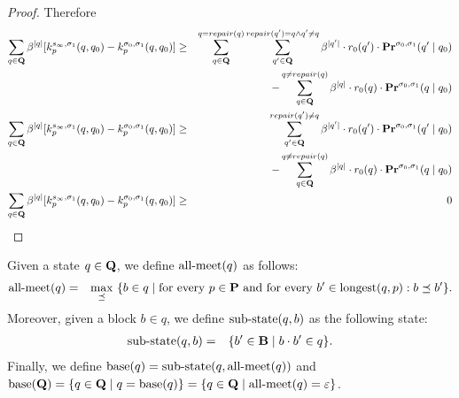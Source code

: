 \begin{proof}
	Therefore
	\begin{eqnarray*}
		\sum_{q \in \mathbf{Q}} \beta^{|q|} [k^{s_{\infty},\sigma_1}_p(q,q_0)- k^{\sigma_0,\sigma_1}_p(q,q_0) ] & \geq & \sum_{q \in \mathbf{Q}}^{q = repair(q)}\sum_{q'\in \mathbf{Q}}^{repair(q') = q \land q' \neq q}  \beta^{|q'|} \cdot r_0(q') \cdot \mathbf{Pr}^{\sigma_0,\sigma_1}(q' \mid q_0)\\
		&& - \sum_{q \in \mathbf{Q}}^{q \neq repair(q)} \beta^{|q|} \cdot r_0(q)\cdot\mathbf{Pr}^{\sigma_0,\sigma_1}(q \mid q_0) \\
		\sum_{q \in \mathbf{Q}} \beta^{|q|} [k^{s_{\infty},\sigma_1}_p(q,q_0)- k^{\sigma_0,\sigma_1}_p(q,q_0) ] & \geq & \sum_{q'\in \mathbf{Q}}^{repair(q') \neq q }  \beta^{|q'|} \cdot r_0(q') \cdot \mathbf{Pr}^{\sigma_0,\sigma_1}(q' \mid q_0)\\
		&& - \sum_{q \in \mathbf{Q}}^{q \neq repair(q)} \beta^{|q|} \cdot r_0(q)\cdot\mathbf{Pr}^{\sigma_0,\sigma_1}(q \mid q_0) \\
		\sum_{q \in \mathbf{Q}} \beta^{|q|} [k^{s_{\infty},\sigma_1}_p(q,q_0)- k^{\sigma_0,\sigma_1}_p(q,q_0) ] & \geq & 0\\
	\end{eqnarray*}
	
	
\end{proof}

Given a state $q \in \mathbf{Q}$, we define $\text{\rm all-meet}(q)$ as follows:
\begin{eqnarray*}
\text{\rm all-meet}(q)  & =  & \max_{\preceq} \ \{b \in q \mid \text{for every } p\in \mathbf{P} \text{ and for every } b' \in {\text{\rm longest}}(q,p): b \preceq b'\}.
\end{eqnarray*}
Moreover, given a block $b \in q$, we define ${\text{\rm sub-state}}(q,b)$ as the following state:
\begin{eqnarray*}
{\text{\rm sub-state}}(q,b) & = & \{ b' \in \mathbf{B} \mid b \cdot b' \in q\}.
\end{eqnarray*}
Finally, 
we define $\text{\rm base}(q) = {\text{\rm sub-state}}(q,\text{\rm all-meet}(q))$ 
and $\text{\rm base}(\mathbf{Q}) = \{q \in \mathbf{Q} \mid q = \text{\rm base}(q)\} = \{q \in \mathbf{Q} \mid \text{\rm all-meet}(q) = \varepsilon \}$.

